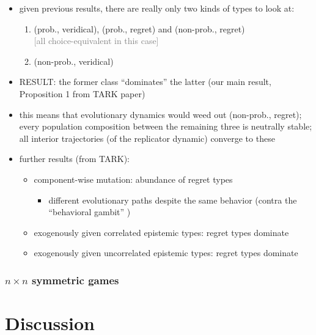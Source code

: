 \documentclass[fleqn,reqno,11pt]{article}
\begin{document}
\begin{itemize}
\item given previous results, there are really only two kinds of types to look at:
  \begin{enumerate}
  \item (prob., veridical), (prob., regret) and (non-prob., regret) \\ 
    \textcolor{gray}{[all choice-equivalent in this case]}
  \item (non-prob., veridical)
  \end{enumerate}
\item RESULT: the former class ``dominates'' the latter (our main result, Proposition 1 from
  TARK paper)
\item this means that evolutionary dynamics would weed out (non-prob., regret); every
  population composition between the remaining three is neutrally stable; all interior
  trajectories (of the replicator dynamic) converge to these
\item further results (from TARK):
  \begin{itemize}
  \item component-wise mutation: abundance of regret types
    \begin{itemize}
    \item different evolutionary paths despite the same behavior (contra the ``behavioral
      gambit'' \citep{FawcettHamblin2013:Exposing-the-be})
    \end{itemize}
  \item exogenously given correlated epistemic types: regret types dominate
  \item exogenously given uncorrelated epistemic types: regret types dominate
  \end{itemize}
\end{itemize}

\subsubsection{$n \times n$ symmetric games}


\section{Discussion}
\end{document}
